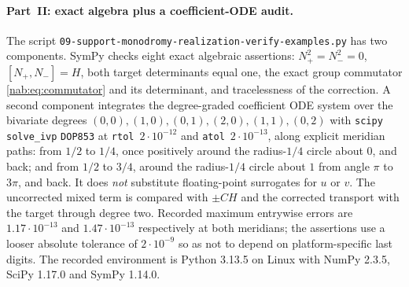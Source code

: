 \documentclass[11pt,letterpaper]{article}
\theoremstyle{definition}
\theoremstyle{remark}
\numberwithin{equation}{section}
\begin{document}
\paragraph{Part~II: exact algebra plus a coefficient-ODE audit.}
The script
\nolinkurl{09-support-monodromy-realization-verify-examples.py} has two
components. SymPy checks eight exact algebraic assertions:
$N_+^2=N_-^2=0$, $[N_+,N_-]=H$, both target determinants equal one, the exact
group commutator \eqref{nab:eq:commutator} and its determinant, and
tracelessness of the correction. A second component integrates the
degree-graded coefficient ODE system over the bivariate degrees
$(0,0),(1,0),(0,1),(2,0),(1,1),(0,2)$ with \texttt{scipy} \texttt{solve\_ivp}
\texttt{DOP853} at \texttt{rtol}~$2\cdot10^{-12}$ and
\texttt{atol}~$2\cdot10^{-13}$, along explicit meridian paths: from $1/2$ to
$1/4$, once positively around the radius-$1/4$ circle about $0$, and back; and
from $1/2$ to $3/4$, around the radius-$1/4$ circle about $1$ from angle $\pi$
to $3\pi$, and back. It does \emph{not} substitute floating-point surrogates
for $u$ or $v$. The uncorrected mixed term is compared with $\pm CH$ and the
corrected transport with the target through degree two. Recorded maximum
entrywise errors are $1.17\cdot10^{-13}$ and $1.47\cdot10^{-13}$ respectively
at both meridians; the assertions use a looser absolute tolerance of
$2\cdot10^{-9}$ so as not to depend on platform-specific last digits. The
recorded environment is Python 3.13.5 on Linux with NumPy 2.3.5, SciPy 1.17.0
and SymPy 1.14.0.
\end{document}
